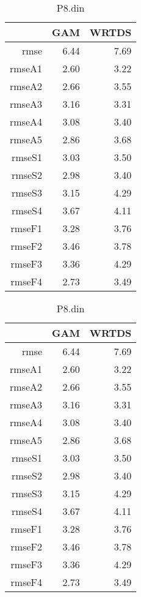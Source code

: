 \documentclass[12pt]{amsart}
\begin{document}
\begin{table}[H]
\centering
\begin{tabular}{rrr}
  \hline
 & GAM & WRTDS \\ 
  \hline
rmse & 6.44 & 7.69 \\ 
  rmseA1 & 2.60 & 3.22 \\ 
  rmseA2 & 2.66 & 3.55 \\ 
  rmseA3 & 3.16 & 3.31 \\ 
  rmseA4 & 3.08 & 3.40 \\ 
  rmseA5 & 2.86 & 3.68 \\ 
  rmseS1 & 3.03 & 3.50 \\ 
  rmseS2 & 2.98 & 3.40 \\ 
  rmseS3 & 3.15 & 4.29 \\ 
  rmseS4 & 3.67 & 4.11 \\ 
  rmseF1 & 3.28 & 3.76 \\ 
  rmseF2 & 3.46 & 3.78 \\ 
  rmseF3 & 3.36 & 4.29 \\ 
  rmseF4 & 2.73 & 3.49 \\ 
   \hline
\end{tabular}
\caption{P8.din}
\end{table}

\begin{table}[H]
\centering
\begin{tabular}{rrr}
  \hline
 & GAM & WRTDS \\ 
  \hline
rmse & 6.44 & 7.69 \\ 
  rmseA1 & 2.60 & 3.22 \\ 
  rmseA2 & 2.66 & 3.55 \\ 
  rmseA3 & 3.16 & 3.31 \\ 
  rmseA4 & 3.08 & 3.40 \\ 
  rmseA5 & 2.86 & 3.68 \\ 
  rmseS1 & 3.03 & 3.50 \\ 
  rmseS2 & 2.98 & 3.40 \\ 
  rmseS3 & 3.15 & 4.29 \\ 
  rmseS4 & 3.67 & 4.11 \\ 
  rmseF1 & 3.28 & 3.76 \\ 
  rmseF2 & 3.46 & 3.78 \\ 
  rmseF3 & 3.36 & 4.29 \\ 
  rmseF4 & 2.73 & 3.49 \\ 
   \hline
\end{tabular}
\caption{P8.din}
\end{table}
\end{document}
